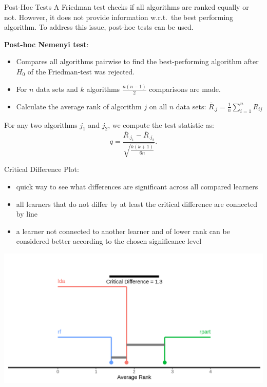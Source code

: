     \begin{frame}[c,allowframebreaks]{Post-Hoc Tests}
    A Friedman test checks if all algorithms are ranked equally or not. However,
    it does not provide information w.r.t.\ the best performing algorithm.
    To address this issue, post-hoc tests can be used.

    \bigskip

    \textbf{Post-hoc Nemenyi test}:
    \begin{itemize}
    \item Compares all algorithms pairwise to find the best-performing algorithm after $H_0$ of the Friedman-test was rejected.
    \item For $n$ data sets and $k$ algorithms $\frac{n(n-1)}{2}$ comparisons are made.
    \item Calculate the average rank of algorithm $j$ on all $n$ data sets: $\bar{R}_{.j} =\frac{1}{n} \sum_{i=1}^n R_{ij}$
    \end{itemize}

    For any two algorithms $j_1$ and $j_2$, we compute the test statistic as:
    $$q = \frac{\bar{R}_{.j_1} - \bar{R}_{.j_2}}{\sqrt{\frac{k(k+1)}{6n}}}.$$

    \framebreak

    Critical Difference Plot:
    \begin{itemize}
        \item quick way to see what differences are significant across all
            compared learners
        \item all learners that do not differ by at least the critical
            difference are connected by line
        \item a learner not connected to another learner and of lower rank can
            be considered better according to the chosen significance level
    \end{itemize}

    \begin{center}
        \includegraphics[height=.5\textheight]{crit-diff-nemenyi}
    \end{center}


\end{frame}
